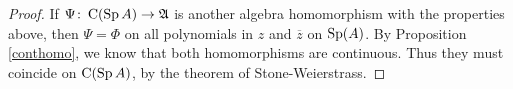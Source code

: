 \begin{proof}
 If $\Psi \colon \operatorname{C} ( \operatorname{Sp} A) \to \mathfrak{A}$ is another algebra homomorphism with the 
 properties above, then $\Psi = \Phi$ on all polynomials in $z$ and 
 $\overline{z}$ on $\operatorname{Sp} (A)$. By Proposition \ref{conthomo}, we know that both homomorphisms are
 continuous. Thus  they must coincide on $\operatorname{C} ( \operatorname{Sp} A )$, by the theorem
 of Stone-Weierstrass.
\end{proof}





